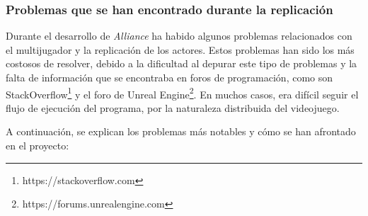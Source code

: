 \subsubsection{Problemas que se han encontrado durante la replicación}

Durante el desarrollo de \textit{Alliance} ha habido algunos problemas relacionados con el multijugador y la replicación de los actores. Estos problemas han sido los más costosos de resolver, debido a la dificultad al depurar este tipo de problemas y la falta de información que se encontraba en foros de programación, como son StackOverflow\footnote{https://stackoverflow.com} y el foro de Unreal Engine\footnote{https://forums.unrealengine.com}. En muchos casos, era difícil seguir el flujo de ejecución del programa, por la naturaleza distribuida del videojuego. 

A continuación, se explican los problemas más notables y cómo se han afrontado en el proyecto:

